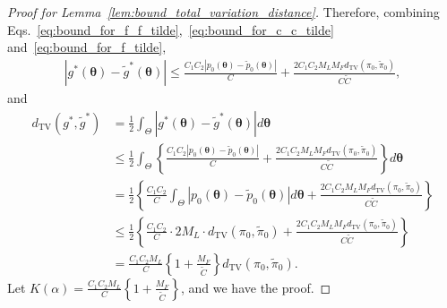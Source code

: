 \documentclass[12pt]{article}
\begin{document}
\begin{proof}[Proof for Lemma~\ref{lem:bound_total_variation_distance}]
    Therefore, combining Eqs.~\eqref{eq:bound_for_f_f_tilde},~\eqref{eq:bound_for_c_c_tilde} and~\eqref{eq:bound_for_f_tilde},
    \begin{align*}
        \left|g^*(\bm{\theta}) - \tilde{g}^*(\bm{\theta})\right| \leq \frac{C_1 C_2 |p_0(\bm{\theta}) - \tilde{p}_0(\bm{\theta})|}{C} + \frac{2 C_1 C_2 M_L M_F  d_{\mathrm{TV}}(\pi_0, \tilde{\pi}_0)}{C\tilde{C}},
    \end{align*}
    and
    \begin{align*}
        d_{\mathrm{TV}}(g^*, \tilde{g}^*) &= \frac{1}{2}\int_\Theta \left|g^*(\bm{\theta}) - \tilde{g}^*(\bm{\theta}) \right| d\bm{\theta} \\
        &\leq \frac{1}{2}\int_\Theta \left\{ \frac{C_1 C_2 |p_0(\bm{\theta}) - \tilde{p}_0(\bm{\theta})|}{C} + \frac{2 C_1 C_2 M_L M_F  d_{\mathrm{TV}}(\pi_0, \tilde{\pi}_0)}{C\tilde{C}} \right\} d\bm{\theta} \\
        &= \frac{1}{2}\left\{\frac{C_1 C_2}{C}\int_\Theta |p_0(\bm{\theta}) - \tilde{p}_0(\bm{\theta})| d\bm{\theta} + \frac{2 C_1 C_2 M_L M_F  d_{\mathrm{TV}}(\pi_0, \tilde{\pi}_0)}{C\tilde{C}} \right\} \\
        &\leq \frac{1}{2}\left\{\frac{C_1 C_2}{C}\cdot 2M_L \cdot d_{\mathrm{TV}}(\pi_0, \tilde{\pi}_0) + \frac{2 C_1 C_2 M_L M_F  d_{\mathrm{TV}}(\pi_0, \tilde{\pi}_0)}{C\tilde{C}} \right\} \\
        &= \frac{C_1 C_2 M_L}{C} \left\{1 + \frac{M_F}{\tilde{C}}\right\} d_{\mathrm{TV}}(\pi_0, \tilde{\pi}_0).
    \end{align*}
    Let $K(\alpha) = \frac{C_1 C_2 M_L}{C} \left\{1 + \frac{M_F}{\tilde{C}}\right\}$, and we have the proof.
\end{proof}
\end{document}
